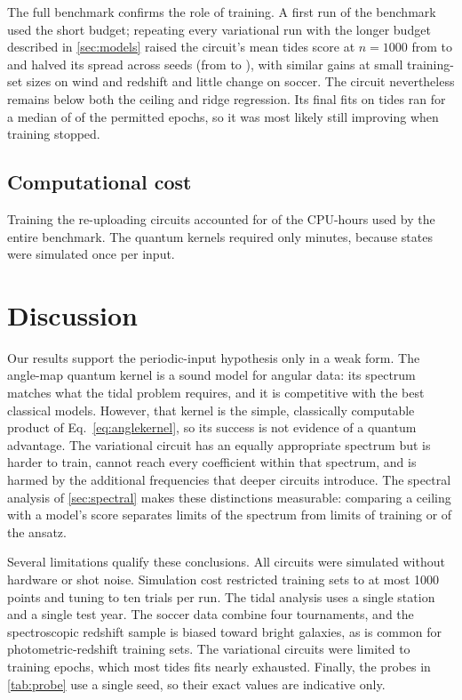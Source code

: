 \documentclass[11pt,letterpaper]{article}
\begin{document}
The full benchmark confirms the role of training. A first run of the benchmark used the short
budget; repeating every variational run with the longer budget described in
\cref{sec:models} raised the circuit's mean tides score at $n=1000$ from \tidesVQCvOne{} to
\tidesVQC{} and halved its spread across seeds (from \tidesVQCvOneSd{} to \tidesVQCSd{}),
with similar gains at small training-set sizes on wind and redshift and little change on
soccer. The circuit nevertheless remains below both the ceiling and ridge regression. Its final
fits on tides ran for a median of \tidesVQCEpochs{} of the \vqcEpochs{} permitted epochs, so it
was most likely still improving when training stopped.

\subsection{Computational cost}

Training the re-uploading circuits accounted for \vqcHours{} of the \allHours{} CPU-hours
used by the entire benchmark. The quantum kernels required only minutes, because states were
simulated once per input.

\section{Discussion}

Our results support the periodic-input hypothesis only in a weak form. The angle-map quantum
kernel is a sound model for angular data: its spectrum matches what the tidal problem
requires, and it is competitive with the best classical models. However, that kernel is the
simple, classically computable product of Eq.~\eqref{eq:anglekernel}, so its success is not
evidence of a quantum advantage. The variational circuit has an equally appropriate spectrum
but is harder to train, cannot reach every coefficient within that spectrum, and is harmed by
the additional frequencies that deeper circuits introduce. The spectral analysis of
\cref{sec:spectral} makes these distinctions measurable: comparing a ceiling with a model's
score separates limits of the spectrum from limits of training or of the ansatz.

Several limitations qualify these conclusions. All circuits were simulated without hardware or
shot noise. Simulation cost restricted training sets to at most 1000 points and tuning to ten
trials per run. The tidal analysis uses a single station and a single test year. The soccer
data combine four tournaments, and the spectroscopic redshift sample is biased toward bright
galaxies, as is common for photometric-redshift training sets. The variational circuits
were limited to \vqcEpochs{} training epochs, which most tides fits nearly exhausted. Finally,
the probes in \cref{tab:probe} use a single seed, so their exact values are indicative only.
\end{document}
